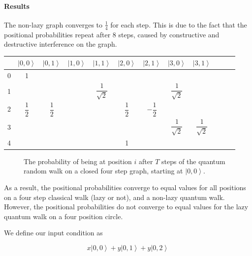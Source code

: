 \documentclass[a0,portrait]{a0poster}
\newcommand{\ket}[1]{\left| #1\right\rangle}
\begin{document}
\begin{center}
{\paragraph{Results}
The non-lazy graph converges to $\frac{1}{4}$ for each step. This is due to the fact that the positional probabilities repeat after 8 steps, caused by constructive and destructive interference on the graph.

\begin{center}
\small
\begin{tabular}{|c||c|c|c|c|c|c|c|c|c|c|c|}
\hline 
& $\ket{0,0}$ & $\ket{0,1}$ & $\ket{1,0}$ & $\ket{1,1}$ & $\ket{2,0}$ & $\ket{2,1}$ & $\ket{3,0}$ & $\ket{3,1}$ \\
\hline \hline
\hspace*{\fill} 0 \hspace*{\fill} & 1  &  &  &  &  &  & & \\
\hline 
1 &  &  &  &  
$\dfrac{ 1 }{ \sqrt{2} }$ & & &
$\dfrac{ 1 }{ \sqrt{2} }$  & 
\hspace*{\fill} \\
\hline 
2 &  
$\dfrac{ 1 }{ 2 }$ & 
$\dfrac{ 1 }{ 2 }$ & & &
$\dfrac{ 1 }{ 2 }$ & 
$-\dfrac{ 1 }{ 2 }$ & & &
\hspace*{\fill} \\
\hline 
3 & & & & & & & 
$\dfrac{ 1 }{ \sqrt{2} }$ & 
$\dfrac{ 1 }{ \sqrt{2} }$
\hspace*{\fill} \\
\hline
\hspace*{\fill} 4 \hspace*{\fill} &  &  &  &  & 1 &  & & \\
\hline 
\end{tabular}
\end{center}

\begin{figure}
\caption{The probability of being at position $i$ after $T$ steps of the quantum random walk on a closed four step graph, starting at $\ket{0,0}$.}
\label{quan_ti}
\end{figure}    

As a result, the positional probabilities converge to equal values for all positions on a four step classical walk (lazy or not), and a non-lazy quantum walk. However, the positional probabilities do not converge to equal values for the lazy quantum walk on a four position circle.

We define our input condition as 

\begin{equation}
x\ket{0,0}+y\ket{0,1}+y\ket{0,2}
\end{equation}
 
}
\end{center}
\end{document}

